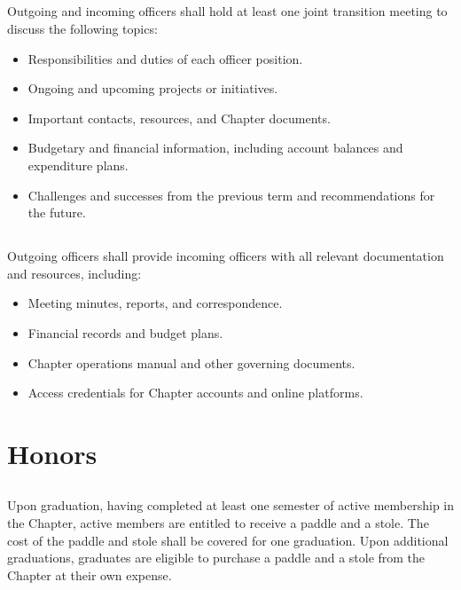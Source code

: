 \documentclass[10pt, oneside]{article}
\begin{document}
\subsection{}
Outgoing and incoming officers shall hold at least one joint transition meeting to discuss the following topics:
\begin{itemize}
    \item Responsibilities and duties of each officer position.
    \item Ongoing and upcoming projects or initiatives.
    \item Important contacts, resources, and Chapter documents.
    \item Budgetary and financial information, including account balances and expenditure plans.
    \item Challenges and successes from the previous term and recommendations for the future.
\end{itemize}

\subsection{}
Outgoing officers shall provide incoming officers with all relevant documentation and resources, including:
\begin{itemize}
    \item Meeting minutes, reports, and correspondence.
    \item Financial records and budget plans.
    \item Chapter operations manual and other governing documents.
    \item Access credentials for Chapter accounts and online platforms.
\end{itemize}



\section{Honors}
\subsection{}
Upon graduation, having completed at least one semester of active membership in the Chapter, active members are entitled to receive a paddle and a stole. The cost of the paddle and stole shall be covered for one graduation. Upon additional graduations, graduates are eligible to purchase a paddle and a stole from the Chapter at their own expense.
\end{document}
